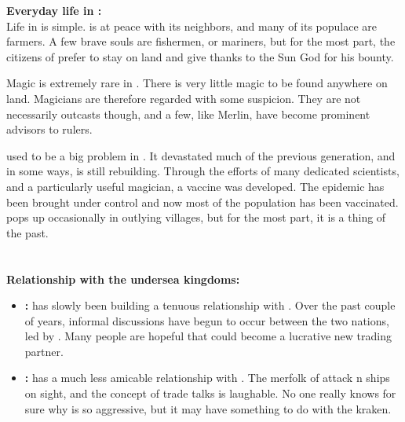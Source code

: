 \documentclass[blue]{NeptuneBall}
\begin{document}
{\bf Everyday life in \pAmerica{}:}\\
Life in \pAmerica{} is simple. \pAmerica{} is at peace with its neighbors, and many of its populace are farmers. A few brave souls are fishermen, or mariners, but for the most part, the citizens of \pAmerica{} prefer to stay on land and give thanks to the Sun God for his bounty.

Magic is extremely rare in \pAmerica{}. There is very little magic to be found anywhere on land. Magicians are therefore regarded with some suspicion. They are not necessarily outcasts though, and a few, like Merlin, have become prominent advisors to rulers.

\cPolio{} used to be a big problem in \pAmerica{}. It devastated much of the previous generation, and in some ways, \pAmerica{} is still rebuilding. Through the efforts of many dedicated scientists, and a particularly useful magician, a vaccine was developed. The epidemic has been brought under control and now most of the population has been vaccinated. \cPolio{} pops up occasionally in outlying villages, but for the most part, it is a thing of the past.\\ \\ \\

{\bf Relationship with the undersea kingdoms:}
\begin{itemize}
  \item {\bf \pAtlantis{}:} \pAmerica{} has slowly been building a tenuous relationship with \pAtlantis{}. Over the past couple of years, informal discussions  have begun to occur between the two nations, led by \cAriel{\King} \cAriel{}. Many people are hopeful that \pAtlantis{} could become a lucrative new trading partner.
  \item {\bf \pPacifica{}:} \pAmerica{} has a much less amicable relationship with \pPacifica{}. The merfolk of \pPacifica{} attack \pAmerica{}n ships on sight, and the concept of trade talks is laughable. No one really knows for sure why \pPacifica{} is so aggressive, but it may have something to do with the kraken.
\end{itemize}
\end{document}
